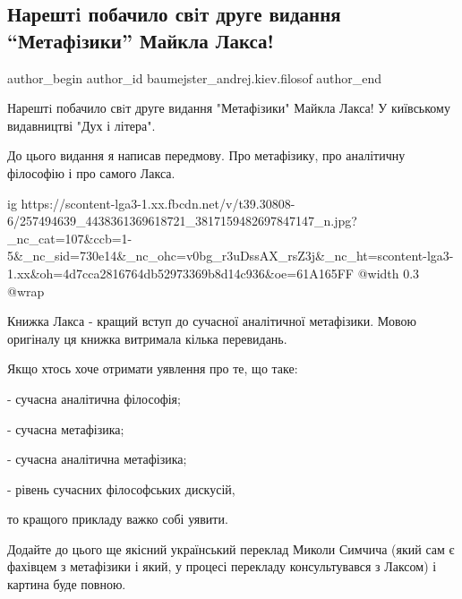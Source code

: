  
 
 
 
 
 
\subsection{Нарештi побачило свiт друге видання \enquote{Метафiзики} Майкла Лакса!}
\label{sec:15_11_2021.fb.baumejster_andrej.kiev.filosof.1.metafizika_kniga}
 
\ifcmt
 author_begin
   author_id baumejster_andrej.kiev.filosof
 author_end
\fi

Нарештi побачило свiт друге видання "Метафiзики" Майкла Лакса! У київському
видавництві "Дух і літера". 

До цього видання я написав передмову. Про метафізику, про аналітичну філософію
і про самого Лакса. 

\ifcmt
  ig https://scontent-lga3-1.xx.fbcdn.net/v/t39.30808-6/257494639_4438361369618721_3817159482697847147_n.jpg?_nc_cat=107&ccb=1-5&_nc_sid=730e14&_nc_ohc=v0bg_r3uDssAX_rsZ3j&_nc_ht=scontent-lga3-1.xx&oh=4d7cca2816764db52973369b8d14c936&oe=61A165FF
  @width 0.3
  @wrap 
\fi

Книжка Лакса - кращий вступ до сучасної аналітичної метафізики. Мовою оригіналу
ця книжка витримала кілька перевидань. 

Якщо хтось хоче отримати уявлення про те, що таке: 

- сучасна аналітична філософія;

- сучасна метафізика;

- сучасна аналітична метафізика; 

- рівень сучасних філософських дискусій,

то кращого прикладу важко собі уявити.

Додайте до цього ще якісний український переклад Миколи Симчича (який сам є
фахівцем з метафізики і який, у процесі перекладу консультувався з Лаксом) і
картина буде повною.

